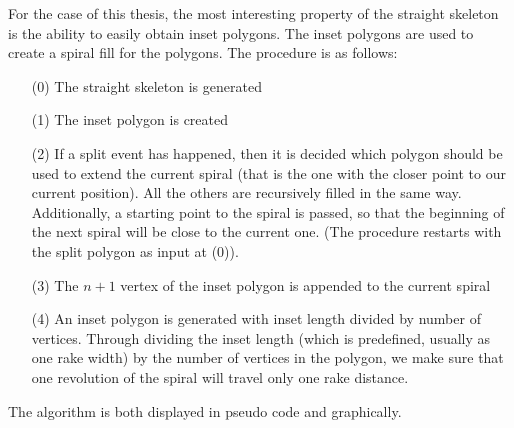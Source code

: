 \documentclass[10pt,twoside,a4paper]{report}
\begin{document}
For the case of this thesis, the most interesting property of the straight skeleton is the ability to easily obtain inset polygons. The inset polygons are used to create a spiral fill for the polygons. The procedure is as follows:

\begin{itemize}
\item[(0)] The straight skeleton is generated
\item[(1)] The inset polygon is created
\item[(2)] If a split event has happened, then it is decided which polygon should be used to extend the current spiral (that is the one with the closer point to our current position). All the others are recursively filled in the same way. Additionally, a starting point to the spiral is passed, so that the beginning of the next spiral will be close to the current one. (The procedure restarts with the split polygon as input at (0)).
\item[(3)] The $n+1$ vertex of the inset polygon is appended to the current spiral
\item[(4)] An inset polygon is generated with inset length divided by number of vertices. Through dividing the inset length (which is predefined, usually as one rake width) by the number of vertices in the polygon, we make sure that one revolution of the spiral will travel only one rake distance.

\end{itemize}


The algorithm is both displayed in pseudo code and graphically. 
\end{document}
